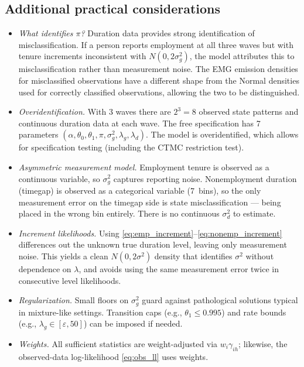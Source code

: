 \documentclass[12pt]{article}
\begin{document}
\subsection{Additional practical considerations}
\begin{itemize}\itemsep4pt
\item \emph{What identifies \(\pi\)?} Duration data provides strong identification of misclassification. If a person reports employment at all three waves but with tenure increments inconsistent with \(N(0,2\sigma_g^2)\), the model attributes this to misclassification rather than measurement noise. The EMG emission densities for misclassified observations have a different shape from the Normal densities used for correctly classified observations, allowing the two to be distinguished.
\item \emph{Overidentification.} With 3 waves there are \(2^3=8\) observed state patterns and continuous duration data at each wave. The free specification has 7 parameters \((\alpha,\theta_0,\theta_1,\pi,\sigma_g^2,\lambda_g,\lambda_d)\). The model is overidentified, which allows for specification testing (including the CTMC restriction test).
\item \emph{Asymmetric measurement model.} Employment tenure is observed as a continuous variable, so \(\sigma_g^2\) captures reporting noise. Nonemployment duration (timegap) is observed as a categorical variable (7~bins), so the only measurement error on the timegap side is state misclassification --- being placed in the wrong bin entirely. There is no continuous \(\sigma_d^2\) to estimate.
\item \emph{Increment likelihoods.} Using \eqref{eq:emp_increment}--\eqref{eq:nonemp_increment} differences out the unknown true duration level, leaving only measurement noise. This yields a clean \(N(0,2\sigma^2)\) density that identifies \(\sigma^2\) without dependence on \(\lambda\), and avoids using the same measurement error twice in consecutive level likelihoods.
\item \emph{Regularization.} Small floors on \(\sigma_g^2\) guard against pathological solutions typical in mixture-like settings. Transition caps (e.g., \(\theta_1\le 0.995\)) and rate bounds (e.g., \(\lambda_g \in [\varepsilon, 50]\)) can be imposed if needed.
\item \emph{Weights.} All sufficient statistics are weight-adjusted via \(w_i\gamma_{ih}\); likewise, the observed-data log-likelihood \eqref{eq:obs_ll} uses weights.
\end{itemize}
\end{document}
